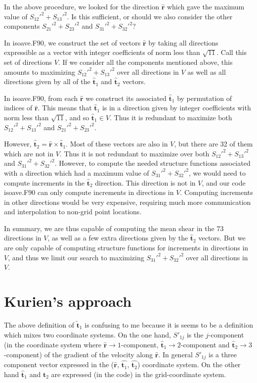 \documentclass[12pt]{article}
\begin{document}
In the above procedure, we looked for the direction $ \bm{{\hat r}}$
which gave the maximum value of $S_{12}'^2 + S_{13}'^2$.  
Is this sufficient, or should we also consider the other
components $S_{21}'^2 + S_{23}'^2$ and 
$S_{31}'^2 + S_{32}'^2$?  

In isoave.F90, we construct the set of vectors $\bm{{\hat r}}$ 
by taking all directions expressible as a vector with integer
coefficients of norm less than $\sqrt{11}$. Call this set
of directions $V$.   If we consider all the components mentioned
above, this amounts to maximizing $S_{12}'^2 + S_{13}'^2$ over
all directions in $V$ as well as all directions given by
all of the $\bm{{\hat t}}_1$ and $\bm{{\hat t}}_2$ vectors.

In isoave.F90, from each $\bm{{\hat r}}$ we construct its associated
$\bm{{\hat t}}_1$ by permutation of indices of $\bm{{\hat r}}$.
This means that $\bm{{\hat t}}_1$ is in a direction given by integer coefficients
with norm less than $\sqrt{11}$, and so $\bm{{\hat t}}_1 \in V$.  
Thus it is redundant to maximize
both $S_{12}'^2 + S_{13}'^2$ and $S_{21}'^2 + S_{23}'^2$.

However, $\bm{{\hat t}}_2 = \bm{{\hat r}} \times \bm{{\hat t}}_1$.
Most of these vectors are also in $V$, but there are 32 of them 
which are not in $V$.  Thus it is not redundant to maximize over
both $S_{12}'^2 + S_{13}'^2$ and $S_{31}'^2 + S_{32}'^2$.
However, to compute the needed structure functions associated with
a direction which had a maximum value of $S_{31}'^2 + S_{32}'^2$, we
would need to compute increments in the $\bm{{\hat t}}_2$ direction.
This direction is not in $V$, and our code isoave.F90 can only 
compute increments in directions in $V$.  Computing increments in
other directions would be very expensive, requiring much more communication
and interpolation to non-grid point locations.

In summary, we are thus capable of computing the mean shear in
the 73 directions in $V$, as well as a few extra directions given by the
$\bm{{\hat t}}_2$ vectors.   But we are only capable of computing
structure functions for increments in directions in $V$, and thus
we limit our search to maximizing $S_{31}'^2 + S_{32}'^2$ over
all directions in $V$.  


\section*{Kurien's approach}

The above definition of $\bm{{\tilde t}}_1$ is confusing to me because
it is seems to be a definition which mixes two coordinate systems. On
the one hand, $S'_{1j}$ is the $j$-component (in the coordinate system
where $\hat{\bm{ r}} \rightarrow 1$-component, $\hat{\bm{t}}_1
\rightarrow 2$-component and $\hat{\bm{ t}}_2 \rightarrow
3$-component) of the gradient of the velocity along $\hat{\bm{
r}}$. In general $S'_{1j}$ is a three component vector expressed in
the ($\hat{\bm{ r}}$, $\hat{\bm{t}_1}$, $\hat{\bm{t}_2}$) coordinate
system. On the other hand $\hat{\bm{t}}_1$ and $\hat{\bm{t}}_2$ are
expressed (in the code) in the grid-coordinate system.
\end{document}
